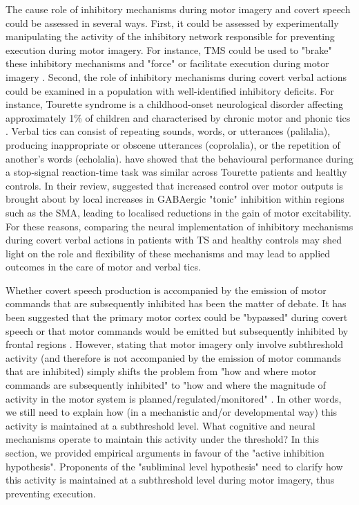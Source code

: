 \documentclass[utf8]{template/frontiersSCNS} %
\begin{document}
The cause role of inhibitory mechanisms during motor imagery and covert speech could be assessed in several ways. First, it could be assessed by experimentally manipulating the activity of the inhibitory network responsible for preventing execution during motor imagery. For instance, TMS could be used to "brake" these inhibitory mechanisms and "force" or facilitate execution during motor imagery \citep[e.g.,][]{angelini_motor_2015, angelini_proactive_2016}. Second, the role of inhibitory mechanisms during covert verbal actions could be examined in a population with well-identified inhibitory deficits. For instance, Tourette syndrome is a childhood-onset neurological disorder affecting approximately 1\% of children and characterised by chronic motor and phonic tics \citep{jackson_inhibition_2015}. Verbal tics can consist of repeating sounds, words, or utterances (palilalia), producing inappropriate or obscene utterances (coprolalia), or the repetition of another’s words (echolalia). \cite{ganos_action_2014} have showed that the behavioural performance during a stop-signal reaction-time task was similar across Tourette patients and healthy controls. In their review, \cite{jackson_inhibition_2015} suggested that increased control over motor outputs is brought about by local increases in GABAergic "tonic" inhibition within regions such as the SMA, leading to localised reductions in the gain of motor excitability. For these reasons, comparing the neural implementation of inhibitory mechanisms during covert verbal actions in patients with TS and healthy controls may shed light on the role and flexibility of these mechanisms and may lead to applied outcomes in the care of motor and verbal tics.

Whether covert speech production is accompanied by the emission of motor commands that are subsequently inhibited has been the matter of debate. It has been suggested that the primary motor cortex could be "bypassed" during covert speech  \citep[e.g.,][]{tian_mental_2012, tian_effect_2013, tian_mental_2016} or that motor commands would be emitted but subsequently inhibited by frontal regions \citep[e.g.,][]{loevenbruck_cognitive_2018}. However, stating that motor imagery only involve subthreshold activity (and therefore is not accompanied by the emission of motor commands that are inhibited) simply shifts the problem from "how and where motor commands are subsequently inhibited" to "how and where the magnitude of activity in the motor system is planned/regulated/monitored" \citep[see also][]{scheil_motor_2018}. In other words, we still need to explain how (in a mechanistic and/or developmental way) this activity is maintained at a subthreshold level. What cognitive and neural mechanisms operate to maintain this activity under the threshold? In this section, we provided empirical arguments in favour of the "active inhibition hypothesis". Proponents of the "subliminal level hypothesis" need to clarify how this activity is maintained at a subthreshold level during motor imagery, thus preventing execution.
\end{document}
